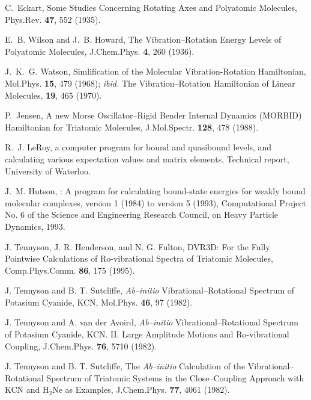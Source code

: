 \begin{thebibliography}{999}
C.~Eckart,
Some Studies Concerning Rotating Axes and Polyatomic
Molecules,
\newblock Phys.Rev. {\bf 47}, 552 (1935).

E.~B. Wilson and J.~B. Howard,
The Vibration--Rotation Energy Levels
of Polyatomic Molecules,
\newblock J.Chem.Phys. {\bf 4}, 260 (1936).

J.~K.~G. Watson,
Simlification of the Molecular Vibration-Rotation
Hamiltonian,
Mol.Phys. {\bf 15}, 479 (1968);
{\it ibid.} 
The Vibration--Rotation Hamiltonian of Linear Molecules,
{\bf 19}, 465 (1970).



P.~Jensen,
A new Morse Oscillator--Rigid Bender Internal
Dynamics (MORBID) Hamiltonian for Triatomic Molecules,
\newblock J.Mol.Spectr. {\bf 128}, 478 (1988).

R.~J. Le{R}oy,
 a 
computer program for bound and quasibound levels, and
calculating various expectation values and matrix elements,
\newblock Technical report, University of Waterloo.

J.~M. Hutson,
: A program for calculating bound-state energies for weakly
bound molecular complexes, version 1 (1984) to version 5 (1993),
\newblock Computational Project No. 6 of the Science and Engineering Research
 Council, on Heavy Particle Dynamics, 1993.

J. Tennyson, J. R. Henderson, and N. G. Fulton,
DVR3D: For the Fully Pointwise Calculations of Ro-vibrational
Spectra of Triatomic Molecules,
Comp.Phys.Comm. {\bf 86}, 175 (1995).



J. Tennyson and B. T. Sutcliffe, 
{\it Ab--initio} Vibrational--Rotational Spectrum of Potasium Cyanide,
KCN,
Mol.Phys. {\bf 46}, 97 (1982).


J. Tennyson and A. van der Avoird, 
{\it Ab--initio} Vibrational--Rotational Spectrum
of Potasium Cyanide, KCN. II. Large Amplitude Motions
and Ro-vibrational Coupling,
J.Chem.Phys. 
{\bf 76}, 5710 (1982).


J. Tennyson and B. T. Sutcliffe, 
The {\it Ab--initio} Calculation of the 
Vibrational--Rotational Spectrum of Triatomic Systems in the  
Close--Coupling Approach with KCN and H$_2$Ne as Examples,
J.Chem.Phys. {\bf 77}, 4061 (1982).



\end{thebibliography}
